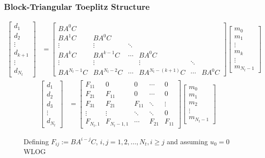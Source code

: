 \begin{frame}
    \frametitle{Block-Triangular Toeplitz Structure}
    \[
    \begin{aligned}
    \begin{bmatrix}
    d_1 \\
    d_2 \\
    \vdots \\
    d_{k+1} \\
    \vdots \\
    d_{N_t}
    \end{bmatrix}
    &=
    \begin{bmatrix}
    B A^0 C \\
    B A^1 C & B A^0 C \\
    \vdots & \vdots & \ddots \\
    B A^k C & B A^{k-1} C & \cdots & B A^0 C \\
    \vdots & \vdots & & \vdots & \ddots \\
    B A^{N_t-1} C & B A^{N_t-2} C & \cdots & B A^{N_t-(k+1)} C & \cdots & B A^0 C
    \end{bmatrix}
    \begin{bmatrix}
    m_0 \\
    m_1 \\
    \vdots \\
    m_k \\
    \vdots \\
    m_{N_t-1}
    \end{bmatrix}
    \end{aligned}
    \]
    \[
    \begin{aligned}
    \begin{bmatrix}
    d_1 \\
    d_2 \\
    d_3 \\
    \vdots \\
    d_{N_t}
    \end{bmatrix}
    &=
    \begin{bmatrix}
    F_{11} & 0 & 0 & \cdots & 0 \\
    F_{21} & F_{11} & 0 & \cdots & 0 \\
    F_{31} & F_{21} & F_{11} & \ddots & \vdots \\
    \vdots & \vdots & \ddots & \ddots & 0 \\
    F_{N_t,1} & F_{N_t-1,1} & \cdots & F_{21} & F_{11}
    \end{bmatrix}
    \begin{bmatrix}
    m_0 \\
    m_1 \\
    m_2 \\
    \vdots \\
    m_{N_t-1}
    \end{bmatrix}
    \end{aligned}
    \]
    \begin{figure}
        \caption{Defining \(F_{ij} := B A^{i-j} C\), \(i,j=1,2,\ldots,N_t, i \ge j\) and assuming \(u_0=0\) WLOG}
    \end{figure}
\end{frame}

